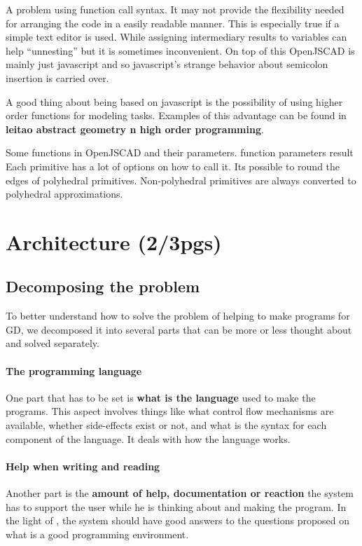 \documentclass{./llncs2e/llncs}
\begin{document}
	A problem using function call syntax.
	It may not provide the flexibility needed for arranging the code in a easily readable manner. 
	This is especially true if a simple text editor is used. 
	While assigning intermediary results to variables can help ``unnesting'' but it is sometimes inconvenient. 
	On top of this OpenJSCAD is mainly just javascript and so javascript's strange behavior about semicolon insertion is carried over. 

	A good thing about being based on javascript is the possibility of using higher order functions for modeling tasks.
	Examples of this advantage can be found in \textbf{leitao abstract geometry n high order programming}.

	Some functions in OpenJSCAD and their parameters.
	function parameters result 
	Each primitive has a lot of options on how to call it.
	Its possible to round the edges of polyhedral primitives.
	Non-polyhedral primitives are always converted to polyhedral approximations.

\section{Architecture (2/3pgs)}

\subsection{Decomposing the problem}
	To better understand how to solve the problem of helping to make programs for GD, we decomposed it into several parts that can be more or less thought about and solved separately.
	
	\paragraph{The programming language}
	One part that has to be set is \textbf{what is the language} used to make the programs.
	This aspect involves things like what control flow mechanisms are available, whether side-effects exist or not, and what is the syntax for each component of the language.
	It deals with how the language works.

	\paragraph{Help when writing and reading}
	Another part is the \textbf{amount of help, documentation or reaction} the system has to support the user while he is thinking about and making the program.
	In the light of \cite{victor2012learnable}, the system should have good answers to the questions proposed on what is a good programming environment.
\end{document}

